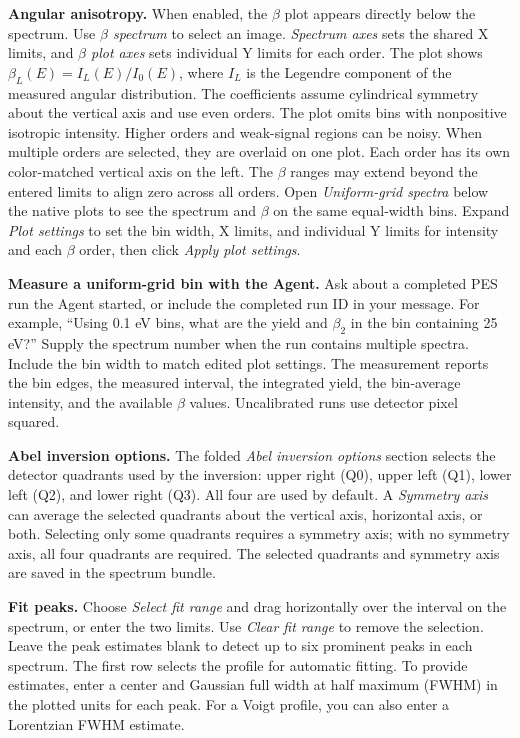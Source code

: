 \documentclass[11pt,a4paper]{article}
\begin{document}
\textbf{Angular anisotropy.} When enabled, the $\beta$ plot appears directly
below the spectrum. Use \emph{$\beta$ spectrum} to select an image.
\emph{Spectrum axes} sets the shared X limits, and \emph{$\beta$ plot axes}
sets individual Y limits for each order. The plot shows
$\beta_L(E)=I_L(E)/I_0(E)$, where
$I_L$ is the Legendre component of the measured angular distribution.
The coefficients assume cylindrical symmetry about the vertical axis
and use even orders. The plot omits bins with nonpositive isotropic
intensity. Higher orders and weak-signal regions can be noisy. When
multiple orders are selected, they are overlaid on one plot. Each order
has its own color-matched vertical axis on the left. The $\beta$ ranges may
extend beyond the entered limits to align zero across all orders.
Open \emph{Uniform-grid spectra} below the native plots to see the spectrum
and $\beta$ on the same equal-width bins. Expand \emph{Plot settings} to set
the bin width, X limits, and individual Y limits for intensity and each
$\beta$ order, then click
\emph{Apply plot settings}.

\textbf{Measure a uniform-grid bin with the Agent.} Ask about a completed
PES run the Agent started, or include the completed run ID in your message.
For example, ``Using 0.1 eV bins, what are the yield and $\beta_2$ in the
bin containing 25 eV?'' Supply the spectrum
number when the run contains multiple spectra. Include the bin width to
match edited plot settings. The measurement reports the bin edges, the
measured interval, the integrated yield, the bin-average intensity, and
the available $\beta$ values. Uncalibrated runs use detector pixel squared.

\textbf{Abel inversion options.} The folded \emph{Abel inversion options}
section selects the detector quadrants used by the inversion: upper right
(Q0), upper left (Q1), lower left (Q2), and lower right (Q3). All four are
used by default. A \emph{Symmetry axis} can average the selected quadrants
about the vertical axis, horizontal axis, or both. Selecting only some
quadrants requires a symmetry axis; with no symmetry axis, all four
quadrants are required. The selected quadrants and symmetry axis are saved
in the spectrum bundle.

\textbf{Fit peaks.} Choose \emph{Select fit range} and drag horizontally over
the interval on the spectrum, or enter the two limits. Use \emph{Clear fit range}
to remove the selection. Leave the peak
estimates blank to detect up to six prominent peaks in each spectrum.
The first row selects the profile for automatic fitting. To provide
estimates, enter a center and Gaussian full width at half maximum (FWHM)
in the plotted units for each peak. For a Voigt profile, you can also enter
a Lorentzian FWHM estimate.
\end{document}
